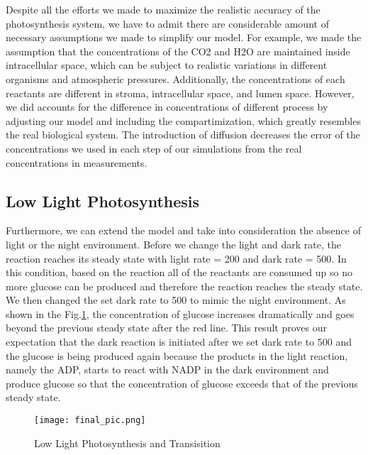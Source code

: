 \documentclass[12pt,reqno]{amsart}
\begin{document}
	Despite all the efforts we made to maximize the realistic accuracy 
	of the photosynthesis system, we have to admit there are considerable 
	amount of necessary assumptions we made to simplify our model. For 
	example, we made the assumption that the concentrations of the CO2 
	and H2O are maintained inside intracellular space, which can be subject 
	to realistic variations in different organisms and atmospheric pressures. 
	Additionally, the concentrations of each reactants are different in 
	stroma, intracellular space, and lumen space. However, we did
	accounts for the difference in concentrations of different process 
	by adjusting our model and including the compartimization, which 
	greatly resembles the real biological system. The introduction of 
	diffusion decreases the error of the concentrations we used in each 
	step of our simulations from the real concentrations in measurements.		
	
	
	\subsection*{Low Light Photosynthesis}
	Furthermore, we can extend the model and take into consideration the absence of light or the night environment. Before we change the light and dark rate, the reaction reaches its steady state with light rate = 200 and dark rate = 500. In this condition, based on the reaction all of the reactants are consumed up so no more glucose can be produced and therefore the reaction reaches the steady state. We then changed the set dark rate to 500 to mimic the night environment. As shown in the Fig.\ref{lowlight}, the concentration of glucose increases dramatically and goes beyond the previous steady state after the red line. This result proves our expectation that the dark reaction is initiated after we set dark rate to 500 and the glucose is being produced again because the products in the light reaction, namely the ADP, starts to react with NADP in the dark environment and produce glucose so that the concentration of glucose exceeds that of the previous steady state.
	
	\begin{figure}[h!]
        \caption{Low Light Photosynthesis and Transisition}
        \centering
        \texttt{[image: final\_pic.png]}
        \label{lowlight}
    \end{figure}
	
	
	
\end{document}
